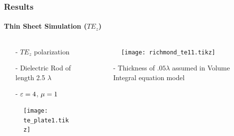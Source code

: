 \documentclass[mathserif,16pt,xcolor=table]{beamer}
\begin{document}
      \begin{frame}
        \frametitle{Results}
        \framesubtitle{Thin Sheet Simulation ($TE_z$)}
        \begin{columns}[T] %
          \begin{column}{.5\textwidth}
            \begin{itemize}
              \item[-]{$TE_z$ polarization}
              \item[-]{Dielectric Rod of length 2.5 $\lambda$}
              \item[-]{$\varepsilon = 4$, $\mu = 1$}
            \end{itemize}
            \begin{figure}
              \centering
              \texttt{[image: te\_plate1.tikz]}
              \label{fig:te_plate}
            \end{figure}
          \end{column}
          \begin{column}[T]{.5\textwidth}
            \begin{figure}
              \vspace*{-1cm}
              \texttt{[image: richmond\_te11.tikz]}
              \label{fig:TE_rcs}
            \end{figure}
            \begin{itemize}
              \item[-]{Thickness of $.05 \lambda$ assumed in Volume Integral equation model}
            \end{itemize}
            \end{column}%
        \end{columns}
      \end{frame}
\end{document}
